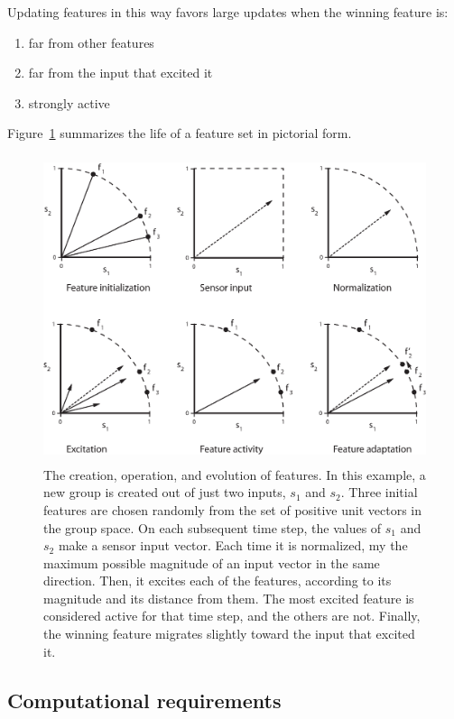  Updating features in this way favors large updates when the winning feature is: 
 
 \begin{enumerate}
 \item far from other features
 \item far from the input that excited it
 \item strongly active
 \end{enumerate}
 
 Figure~\ref{feature_operation} summarizes the life of a feature set in pictorial form.

\begin{figure}
\centering
\includegraphics[height=9cm]{figs/feature_operation.eps}
\caption{The creation, operation, and evolution of features. In this example, a new group is created out of just two inputs, $s_1$ and $s_2$. Three initial features are chosen randomly from the set of positive unit vectors in the group space. On each subsequent time step, the values of $s_1$ and $s_2$ make a sensor input vector. Each time it is normalized, my the maximum possible magnitude of an input vector in the same direction. Then, it excites each of the features, according to its magnitude and its distance from them. The most excited feature is considered active for that time step, and the others are not. Finally, the winning feature migrates slightly toward the input that excited it.}
\label{feature_operation}
\end{figure}


\subsection{Computational requirements}

